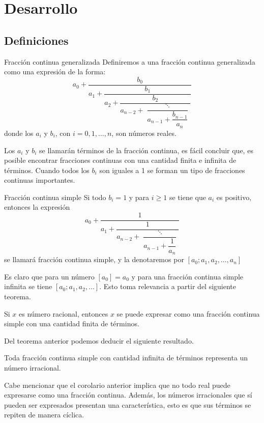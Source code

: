 \section{Desarrollo}

\subsection{Definiciones}

\begin{definition.box}{Fracción continua generalizada}{}
    Definiremos a una fracción continua generalizada como una expresión de la forma:
    \[
        a_0 + \dfrac{b_0}{a_1 + \dfrac{b_1}{a_2 + \dfrac{b_2}{a_{n - 2} + \dfrac{\ddots}{a_{n - 1} + \dfrac{b_{n -1}}{a_n}}}}}
    \]
    donde los $a_i$ y $b_i$, con $i = 0,1, \ldots, n$, son números reales.
\end{definition.box}
Los $a_i$ y $b_i$ se llamarán términos de la fracción continua, es fácil concluir que, es posible encontrar fracciones continuas con una cantidad finita e infinita de términos.
Cuando todos los $b_i$ son iguales a 1 se forman un tipo de fracciones continuas importantes.

\begin{definition.box}{Fracción continua simple}{}
    Si todo $b_i = 1$ y para $i \geq 1$ se tiene que $a_i$ es positivo, entonces la expresión
    \[
        a_0 + \dfrac{1}{a_1 + \dfrac{1}{a_{n - 2} + \dfrac{\ddots}{a_{n - 1} + \dfrac{1}{a_n}}}}
    \]
    se llamará fracción continua simple, y la denotaremos por $[a_0; a_1, a_2, \ldots, a_n]$
\end{definition.box}
Es claro que para un número $[a_0] = a_0$ y para una fracción continua simple infinita se tiene $[a_0; a_1, a_2, \ldots]$.
Esto toma relevancia a partir del siguiente teorema.

\begin{theorem.box}{}{}
    Si $x$ es número racional, entonces $x$ se puede expresar como una fracción continua simple con una cantidad finita de términos.
\end{theorem.box}

Del teorema anterior podemos deducir el siguiente resultado.

\begin{corollary}
    Toda fracción continua simple con cantidad infinita de términos representa un número irracional.
\end{corollary}

Cabe mencionar que el corolario anterior implica que no todo real puede expresarse como una fracción continua.
Además, los números irracionales que sí pueden ser expresados presentan una característica, esto es que sus términos
se repiten de manera cíclica.


